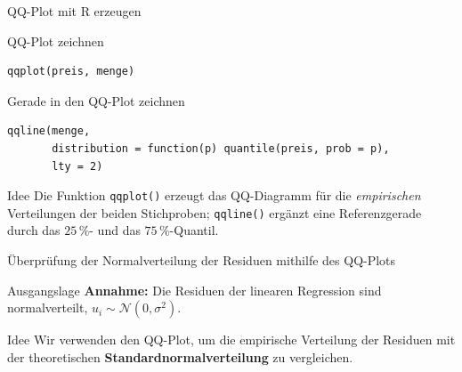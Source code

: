 \documentclass[aspectratio=169,11pt]{beamer}
\begin{document}
\begin{frame}[fragile]{QQ-Plot mit R erzeugen}
  \begin{block}{QQ-Plot zeichnen}
\begin{lstlisting}
qqplot(preis, menge)
\end{lstlisting}
  \end{block}

  \begin{block}{Gerade in den QQ-Plot zeichnen}
\begin{lstlisting}
qqline(menge,
       distribution = function(p) quantile(preis, prob = p),
       lty = 2)
\end{lstlisting}
  \end{block}

  \begin{exampleblock}{Idee}
    Die Funktion \texttt{qqplot()} erzeugt das QQ-Diagramm für die
    \emph{empirischen} Verteilungen der beiden Stichproben;
    \texttt{qqline()} ergänzt eine Referenzgerade durch das $25\,\%$-
    und das $75\,\%$-Quantil.
  \end{exampleblock}
\end{frame}

\begin{frame}{Überprüfung der Normalverteilung der Residuen mithilfe des QQ-Plots}
  \begin{block}{Ausgangslage}
    \textbf{Annahme:} Die Residuen der linearen Regression sind
    normalverteilt, $u_i \sim \mathcal{N}(0,\sigma^{2})$.
  \end{block}

  \begin{exampleblock}{Idee}
    Wir verwenden den QQ-Plot, um die empirische Verteilung der
    Residuen mit der theoretischen \textbf{Standard\-normal\-verteilung}
    zu vergleichen.
  \end{exampleblock}
\end{frame}
\end{document}
